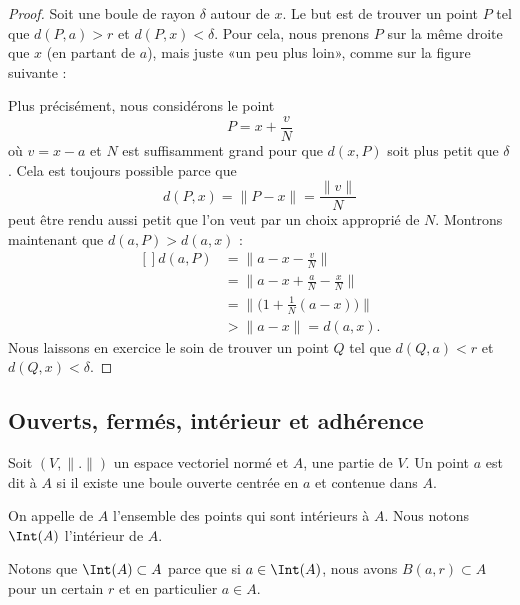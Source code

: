 \begin{proof}
	Soit une boule de rayon $\delta$ autour de $x$. Le but est de trouver un point $P$ tel que $d(P,a)>r$ et $d(P,x)<\delta$. Pour cela, nous prenons $P$ sur la même droite que $x$ (en partant de $a$), mais juste «un peu plus loin», comme sur la figure suivante :

	\begin{center}
		
	\end{center}

	Plus précisément, nous considérons le point
	\begin{equation}
		P=x+\frac{ v }{ N }
	\end{equation}
	où $v=x-a$ et $N$ est suffisamment grand pour que $d(x,P)$ soit plus petit que $\delta$. Cela est toujours possible parce que
	\begin{equation}
		d(P,x)=\| P-x \|=\frac{ \| v \| }{ N }
	\end{equation}
	peut être rendu aussi petit que l'on veut par un choix approprié de $N$. Montrons maintenant que $d(a,P)>d(a,x)$ :
	\begin{equation}
		\begin{aligned}[]
			d(a,P) & =\| a-x-\frac{ v }{ N }\|                  \\
			       & =\| a-x+\frac{ a }{ N }-\frac{ x }{ N } \| \\
			       & =\| \big( 1+\frac{1}{ N }(a-x) \big) \|    \\
			       & >\| a-x \|=d(a,x).
		\end{aligned}
	\end{equation}
	Nous laissons en exercice le soin de trouver un point $Q$ tel que $d(Q,a)<r$ et $d(Q,x)<\delta$.
\end{proof}


\subsection{Ouverts, fermés, intérieur et adhérence}

\begin{definition}
	Soit $(V,\| . \|)$ un espace vectoriel normé et $A$, une partie de $V$. Un point $a$ est dit  à $A$ si il existe une boule ouverte centrée en $a$ et contenue dans $A$.

	On appelle  de $A$ l'ensemble des points qui sont intérieurs à $A$. Nous notons $\Int(A)$ l'intérieur de $A$.
\end{definition}
Notons que $\Int(A)\subset A$ parce que si $a\in\Int(A)$, nous avons $B(a,r)\subset A$ pour un certain $r$ et en particulier $a\in A$.

